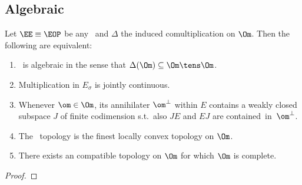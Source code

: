 

\subsection{Algebraic \contexts}

\begin{prop}   \label{prop:char_algebraic:survey}
Let\/ $\EE \equiv \EOP$ be any \context\ and $\Delta$ the induced
comultiplication on\/ $\Om$. Then the following are equivalent:
\begin{enumerate}
  \item \EE\ is algebraic in the sense that\/ $\Delta(\Om) \subseteq \Om\tens\Om$.
  \item Multiplication in\/ $E_\sigma$ is jointly continuous.
  \item Whenever\/ $\om \in \Om$, its annihilater\/ $\om^\bot$ within\/ $E$
        contains a weakly closed subspace\/ $J$ of finite codimension
        s.t.\ also\/ $JE$ and\/ $EJ$ are \mbox{contained in\/ $\om^\bot$}\@.
  \item The \stricta\ topology is the finest locally convex topology on\/ $\Om$.
  \item There exists an\/ \EEdash compatible topology on\/ $\Om$ for which\/ $\Om$ is complete.
\end{enumerate}
\end{prop}

\begin{proof}
\end{proof}
